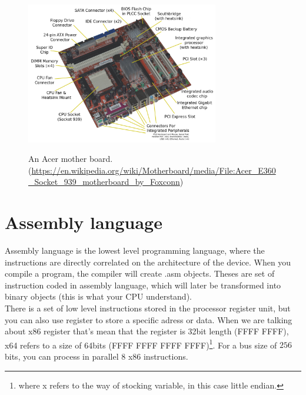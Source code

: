 \documentclass[runningheads,a4paper]{llncs}
\begin{document}
	\begin{figure}
		\centering
		\includegraphics[width=0.75\textwidth]{Figures/MotherBoard}
		\\ \parbox{0.75\textwidth}{\caption[motherboard]{An Acer mother board. (\url{https://en.wikipedia.org/wiki/Motherboard/media/File:Acer_E360_Socket_939_motherboard_by_Foxconn}) }\label{fig:motherboard}} 
	\end{figure}
	
	\section{Assembly language}
	
	Assembly language is the lowest level programming language, where the instructions are directly correlated on the architecture of the device.
	When you compile a program, the compiler will create .asm objects. Theses are set of instruction coded in assembly language, which will later be transformed into binary objects (this is what your CPU understand).\\
	There is a set of low level instructions stored in the processor register unit, but you can also use register to store a specific adress or data. When we are talking about x86 register that's mean that the register is 32bit length (FFFF FFFF), x64 refers to a size of 64bits (FFFF FFFF FFFF FFFF)\footnote{where x refers to the way of stocking variable, in this case little endian.}. For a bus size of $256$ bits, you can process in parallel $8$ x86 instructions.
	
\end{document}
